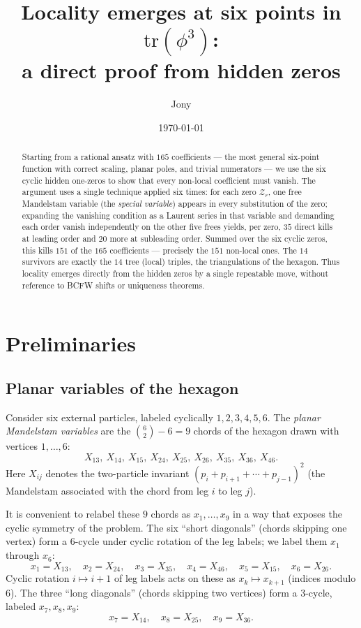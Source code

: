 \documentclass[11pt]{article}
\title{Locality emerges at six points in $\mathrm{tr}(\phi^3)$:\\
a direct proof from hidden zeros}
\author{Jony}
\date{\today}
\newcommand{\X}[2]{X_{#1#2}}
\newcommand{\Z}{\mathcal{Z}}
\theoremstyle{definition}
\begin{document}
\maketitle

\begin{abstract}
Starting from a rational ansatz with $165$ coefficients --- the most general
six-point function with correct scaling, planar poles, and trivial numerators
--- we use the six cyclic hidden one-zeros to show that every non-local
coefficient must vanish. The argument uses a single technique applied six
times: for each zero $\Z_r$, one free Mandelstam variable (the \emph{special
variable}) appears in every substitution of the zero; expanding the vanishing
condition as a Laurent series in that variable and demanding each order vanish
independently on the other five frees yields, per zero, $35$ direct kills at
leading order and $20$ more at subleading order. Summed over the six cyclic
zeros, this kills $151$ of the $165$ coefficients --- precisely the $151$
non-local ones. The $14$ survivors are exactly the $14$ tree (local) triples,
the triangulations of the hexagon. Thus locality emerges directly from the
hidden zeros by a single repeatable move, without reference to BCFW shifts or
uniqueness theorems.
\end{abstract}

\tableofcontents

\section{Preliminaries}

\subsection{Planar variables of the hexagon}

Consider six external particles, labeled cyclically $1,2,3,4,5,6$. The
\emph{planar Mandelstam variables} are the $\binom{6}{2}-6=9$ chords of the
hexagon drawn with vertices $1,\dots,6$:
\[
\X13,\ \X14,\ \X15,\ \X24,\ \X25,\ \X26,\ \X35,\ \X36,\ \X46.
\]
Here $\X{i}{j}$ denotes the two-particle invariant $(p_i+p_{i+1}+\cdots+p_{j-1})^2$
(the Mandelstam associated with the chord from leg $i$ to leg $j$).

It is convenient to relabel these $9$ chords as $x_1,\dots,x_9$ in a way that
exposes the cyclic symmetry of the problem. The six ``short diagonals'' (chords
skipping one vertex) form a $6$-cycle under cyclic rotation of the leg labels;
we label them $x_1$ through $x_6$:
\[
x_1=\X13,\quad x_2=\X24,\quad x_3=\X35,\quad x_4=\X46,\quad x_5=\X15,\quad x_6=\X26.
\]
Cyclic rotation $i\mapsto i+1$ of leg labels acts on these as
$x_k\mapsto x_{k+1}$ (indices modulo $6$). The three ``long diagonals'' (chords
skipping two vertices) form a $3$-cycle, labeled $x_7,x_8,x_9$:
\[
x_7=\X14,\quad x_8=\X25,\quad x_9=\X36.
\]
\end{document}
